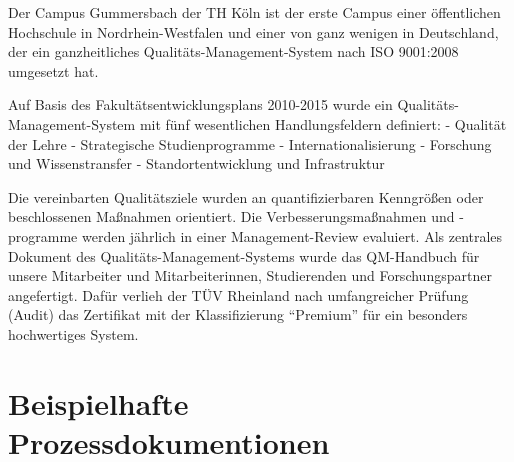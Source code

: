 Der Campus Gummersbach der TH Köln ist der erste Campus einer
öffentlichen Hochschule in Nordrhein-Westfalen und einer von ganz
wenigen in Deutschland, der ein ganzheitliches
Qualitäts-Management-System nach ISO 9001:2008 umgesetzt hat.

Auf Basis des Fakultätsentwicklungsplans 2010-2015 wurde ein
Qualitäts-Management-System mit fünf wesentlichen Handlungsfeldern
definiert: - Qualität der Lehre - Strategische Studienprogramme -
Internationalisierung - Forschung und Wissenstransfer -
Standortentwicklung und Infrastruktur

Die vereinbarten Qualitätsziele wurden an quantifizierbaren Kenngrößen
oder beschlossenen Maßnahmen orientiert. Die Verbesserungsmaßnahmen und
-programme werden jährlich in einer Management-Review evaluiert. Als
zentrales Dokument des Qualitäts-Management-Systems wurde das
QM-Handbuch für unsere Mitarbeiter und Mitarbeiterinnen, Studierenden
und Forschungspartner angefertigt. Dafür verlieh der TÜV Rheinland nach
umfangreicher Prüfung (Audit) das Zertifikat mit der Klassifizierung
``Premium'' für ein besonders hochwertiges System.

\section{Beispielhafte
Prozessdokumentionen\label{/mi-2017/selbstbericht/0900-transparenz-und-dokumentation/0000-transparenz-und-dokumentation}}\label{beispielhafte-prozessdokumentionenpathlabelmi-2017selbstbericht0900-transparenz-und-dokumentation0000-transparenz-und-dokumentation}

